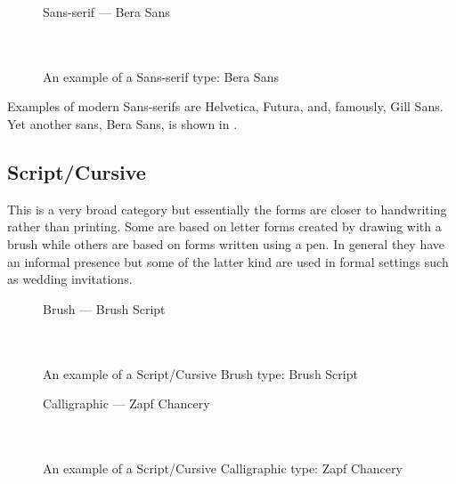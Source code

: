 \documentclass[10pt,letterpaper,extrafontsizes]{memoir}
\begin{document}
\begin{figure}
\centering
{\centering{}\selectfont
  Sans-serif --- Bera Sans \\
  \UCalphabet \\
  \LCalphabet \\
  \fox\par}
\caption{An example of a Sans-serif type: Bera Sans} 
   \label{fig:berasans}
\end{figure}

    Examples of modern Sans-serifs are 
Helvetica, 
Futura,
and, famously, Gill Sans. 
Yet another sans, 
Bera Sans\facesubseeidx{Bera Sans}, is shown in .


\subsection{Script/Cursive}

    This is a very broad category but 
essentially the forms are closer
to handwriting rather than printing. Some are based on letter forms created
by drawing with a brush while others are based on forms written using
a pen. In general they have an informal
presence but some of the latter kind are used in formal settings such 
as wedding invitations.

\begin{figure}
\centering
{\centering%
  Brush  --- Brush Script \\
  \UCalphabet \\
  \LCalphabet \\
  \fox\par}
\caption{An example of a Script/Cursive Brush type: Brush Script} 
   \label{fig:brush}
\end{figure}

\begin{figure}
\centering
{\centering{}\selectfont
  Calligraphic --- Zapf Chancery \\
  \UCalphabet \\
  \LCalphabet \\
  \fox\par}
\caption{An example of a Script/Cursive Calligraphic type: Zapf Chancery} 
   \label{fig:chancery}
\end{figure}
\end{document}
